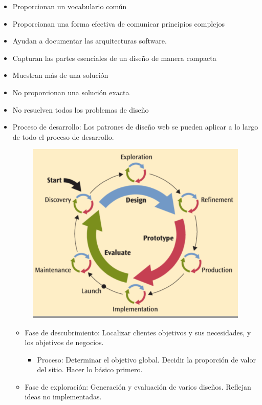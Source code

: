 \documentclass[12pt, twoside, openright]{report} %
\begin{document}
\begin{itemize}
\begin{itemize}
        \end{itemize}
      \item Proporcionan un vocabulario común
      \item  Proporcionan una forma efectiva de comunicar principios
        complejos
      \item Ayudan a documentar las arquitecturas software.
      \item Capturan las partes esenciales de un diseño de manera compacta
        \item Muestran más de una solución
        \item No proporcionan una solución exacta
        \item No resuelven todos los problemas de diseño
        \item Proceso de desarrollo: Los patrones de diseño web se pueden aplicar
          a lo largo de todo el proceso de desarrollo.

          \begin{figure}[H]
            {\includegraphics[scale=.35]{Untitled 27.png}}
          \end{figure}
        \begin{itemize}
          \item Fase de descubrimiento: Localizar clientes objetivos y sus necesidades, y los objetivos de negocios.
          \begin{itemize}

      \item Proceso: Determinar el objetivo global. Decidir la proporción de valor del sitio. Hacer lo básico primero.\end{itemize}
  \item Fase de exploración: Generación y evaluación de varios diseños. Reflejan ideas no implementadas.
  \begin{itemize}


\end{itemize}
\end{itemize}
\end{itemize}
\end{document}
